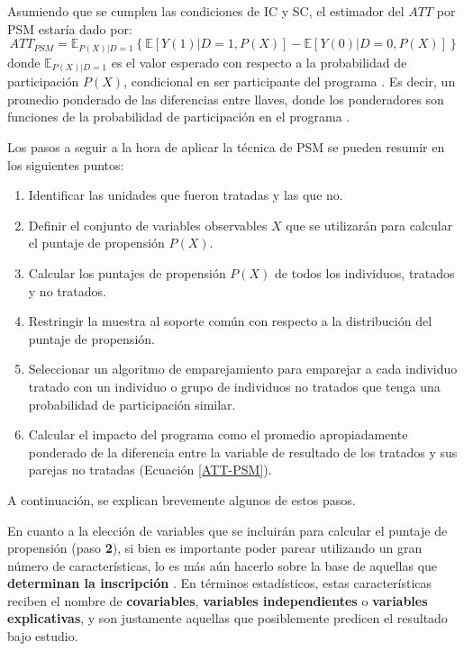 \documentclass[../../main.tex]{subfiles}
\begin{document}
Asumiendo que se cumplen las condiciones de IC y SC, el estimador del \(ATT\) por PSM
estaría dado por:
\begin{equation}
ATT_{PSM} = \mathbb{E}_{P(X)|D=1}
    \left\{
        \mathbb{E}\left[Y(1)|D=1, P(X)\right] - \mathbb{E}\left[Y(0)|D=0, P(X)\right]
    \right\}
    \label{ATT-PSM}
\end{equation}
donde \(\mathbb{E}_{P(X)|D=1}\) es el valor esperado con respecto a la probabilidad de
participación \(P(X)\), condicional en ser participante del programa \cite{bernal}. Es
decir, un promedio ponderado de las diferencias entre llaves, donde los ponderadores
son funciones de la probabilidad de participación en el programa \cite{bernal}.

Los pasos a seguir a la hora de aplicar la técnica de PSM se pueden resumir en los
siguientes puntos:
\begin{enumerate}[label=\textbf{\arabic*.}]
    \item Identificar las unidades que fueron tratadas y las que no.
    \item Definir el conjunto de variables observables \(X\) que se utilizarán para
    calcular el puntaje de propensión \(P(X)\).
    \item Calcular los puntajes de propensión \(P(X)\) de todos los individuos, tratados y
    no tratados.
    \item Restringir la muestra al soporte común con respecto a la distribución
    del puntaje de propensión.
    \item Seleccionar un algoritmo de emparejamiento para emparejar a cada individuo
    tratado con un individuo o grupo de individuos no tratados que tenga una probabilidad
    de participación similar.
    \item Calcular el impacto del programa como el promedio apropiadamente ponderado de la
    diferencia entre la variable de resultado de los tratados y sus parejas no tratadas
    (Ecuación \ref{ATT-PSM}).
\end{enumerate}
A continuación, se explican brevemente algunos de estos pasos.

En cuanto a la elección de variables que se incluirán para calcular el puntaje de
propensión (paso \textbf{2}), si bien es importante poder parear utilizando un gran número
de características, lo es más aún hacerlo sobre la base de aquellas que \textbf{determinan
la inscripción} \cite{gertler-2016}. En términos estadísticos, estas características
reciben el nombre de \textbf{covariables}, \textbf{variables independientes} o
\textbf{variables explicativas}, y son justamente aquellas que posiblemente predicen el
resultado bajo estudio.
\end{document}
